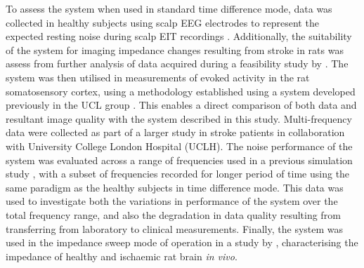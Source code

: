 To assess the system when used in standard time difference mode, data was collected in healthy subjects using scalp EEG electrodes to represent the expected resting noise during scalp EIT recordings \cite{Fabrizi_2006,fabrizi2007analysis,Romsauerova2006}. Additionally, the suitability of the system for imaging impedance changes resulting from stroke in rats was assess from further analysis of data acquired during a feasibility study by \citet{Dowrick_2016}. The system was then utilised in measurements of evoked activity in the rat somatosensory cortex, using a methodology established using a system developed previously in the UCL group \cite{Oh2011,Aristovich_2016}. This enables a direct comparison of both data and resultant image quality with the system described in this study. Multi-frequency data were collected as part of a larger study in stroke patients in collaboration with University College London Hospital (UCLH). The noise performance of the system was evaluated across a range of frequencies used in a previous simulation study \cite{Malone2014a}, with a subset of frequencies recorded for longer period of time using the same paradigm as the healthy subjects in time difference mode. This data was used to investigate both the variations in performance of the system over the total frequency range, and also the degradation in data quality resulting from transferring from laboratory to clinical measurements. Finally, the system was used in the impedance sweep mode of operation in a study by \citet{Dowrick_2015}, characterising the impedance of healthy and ischaemic rat brain \emph{in vivo}. 


